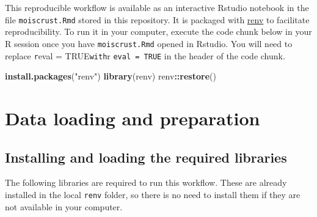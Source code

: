 \documentclass[]{article}
\newenvironment{Shaded}{\begin{snugshade}}{\end{snugshade}}
\newcommand{\KeywordTok}[1]{\textcolor[rgb]{0.13,0.29,0.53}{\textbf{#1}}}
\newcommand{\NormalTok}[1]{#1}
\newcommand{\OperatorTok}[1]{\textcolor[rgb]{0.81,0.36,0.00}{\textbf{#1}}}
\newcommand{\StringTok}[1]{\textcolor[rgb]{0.31,0.60,0.02}{#1}}
\begin{document}
This reproducible workflow is available as an interactive Rstudio
notebook in the file \texttt{moiscrust.Rmd} stored in this repository.
It is packaged with \href{https://cran.r-project.org/package=renv}{renv}
to facilitate reproducibility. To run it in your computer, execute the
code chunk below in your R session once you have \texttt{moiscrust.Rmd}
opened in Rstudio. You will need to replace \texttt{r}eval =
TRUE\texttt{with}r \texttt{eval\ =\ TRUE} in the header of the code
chunk.

\begin{Shaded}
\begin{Highlighting}[]
\KeywordTok{install.packages}\NormalTok{(}\StringTok{"renv"}\NormalTok{)}
\KeywordTok{library}\NormalTok{(renv)}
\NormalTok{renv}\OperatorTok{::}\KeywordTok{restore}\NormalTok{()}
\end{Highlighting}
\end{Shaded}

\hypertarget{data-loading-and-preparation}{%
\section{Data loading and
preparation}\label{data-loading-and-preparation}}

\hypertarget{installing-and-loading-the-required-libraries}{%
\subsection{Installing and loading the required
libraries}\label{installing-and-loading-the-required-libraries}}

The following libraries are required to run this workflow. These are
already installed in the local \texttt{renv} folder, so there is no need
to install them if they are not available in your computer.
\end{document}
